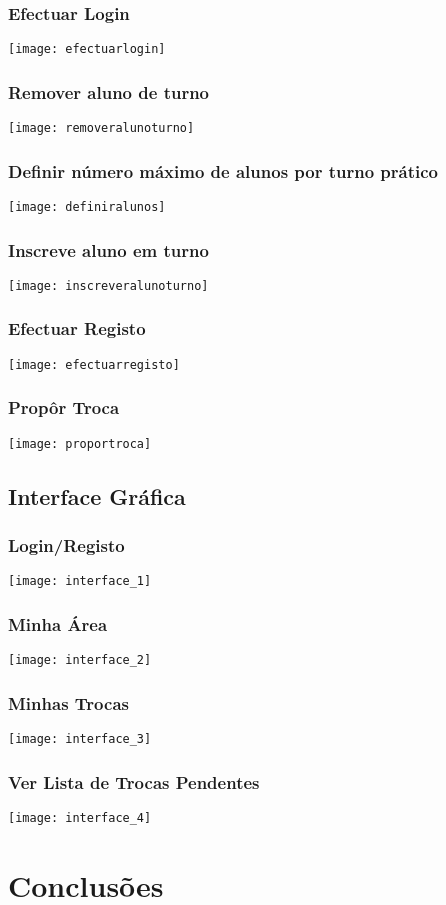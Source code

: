 \documentclass[a4paper]{article}
\begin{document}
\subsubsection{Efectuar Login}
\texttt{[image: efectuarlogin]}\break

\subsubsection{Remover aluno de turno}
\texttt{[image: removeralunoturno]}\break

\subsubsection{Definir número máximo de alunos por turno prático}
\texttt{[image: definiralunos]}\break

\subsubsection{Inscreve aluno em turno}
\texttt{[image: inscreveralunoturno]}\break

\subsubsection{Efectuar Registo}
\texttt{[image: efectuarregisto]}\break

\subsubsection{Propôr Troca}
\texttt{[image: proportroca]}\break



\subsection{Interface Gráfica}

\subsubsection{Login/Registo}
\texttt{[image: interface\_1]}\break

\subsubsection{Minha Área}
\texttt{[image: interface\_2]}\break

\subsubsection{Minhas Trocas}
\texttt{[image: interface\_3]}\break

\subsubsection{Ver Lista de Trocas Pendentes}
\texttt{[image: interface\_4]}\break



\pagebreak
\section{Conclusões}
\label{sec:4}

\hspace{3mm}
\end{document}
